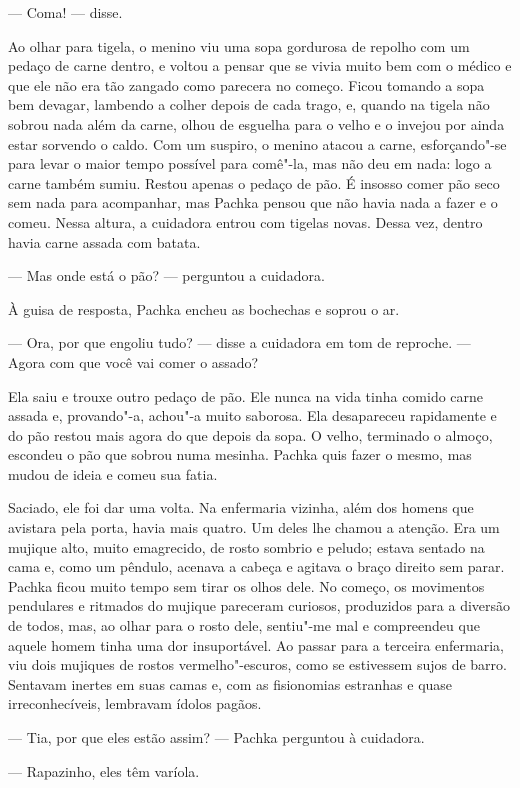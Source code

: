 --- Coma! --- disse.

Ao olhar para tigela, o menino viu uma sopa gordurosa de repolho com um
pedaço de carne dentro, e voltou a pensar que se vivia muito bem com o
médico e que ele não era tão zangado como parecera no começo. Ficou
tomando a sopa bem devagar, lambendo a colher depois de cada trago, e,
quando na tigela não sobrou nada além da carne, olhou de esguelha para o
velho e o invejou por ainda estar sorvendo o caldo. Com um suspiro, o
menino atacou a carne, esforçando"-se para levar o maior tempo possível
para comê"-la, mas não deu em nada: logo a carne também sumiu. Restou
apenas o pedaço de pão. É insosso comer pão seco sem nada para
acompanhar, mas Pachka pensou que não havia nada a fazer e o comeu.
Nessa altura, a cuidadora entrou com tigelas novas. Dessa vez, dentro
havia carne assada com batata.

--- Mas onde está o pão? --- perguntou a cuidadora.

À guisa de resposta, Pachka encheu as bochechas e soprou o ar.

--- Ora, por que engoliu tudo? --- disse a cuidadora em tom de reproche.
--- Agora com que você vai comer o assado?

Ela saiu e trouxe outro pedaço de pão. Ele nunca na vida tinha comido
carne assada e, provando"-a, achou"-a muito saborosa. Ela desapareceu
rapidamente e do pão restou mais agora do que depois da sopa. O velho,
terminado o almoço, escondeu o pão que sobrou numa mesinha. Pachka quis
fazer o mesmo, mas mudou de ideia e comeu sua fatia.

Saciado, ele foi dar uma volta. Na enfermaria vizinha, além dos homens
que avistara pela porta, havia mais quatro. Um deles lhe chamou a
atenção. Era um mujique alto, muito emagrecido, de rosto sombrio e
peludo; estava sentado na cama e, como um pêndulo, acenava a cabeça e
agitava o braço direito sem parar. Pachka ficou muito tempo sem tirar os
olhos dele. No começo, os movimentos pendulares e ritmados do mujique
pareceram curiosos, produzidos para a diversão de todos, mas, ao olhar
para o rosto dele, sentiu"-me mal e compreendeu que aquele homem
tinha uma dor insuportável. Ao passar para a terceira enfermaria, viu
dois mujiques de rostos vermelho"-escuros, como se estivessem sujos de
barro. Sentavam inertes em suas camas e, com as fisionomias estranhas e
quase irreconhecíveis, lembravam ídolos pagãos.

--- Tia, por que eles estão assim? --- Pachka perguntou à cuidadora.

--- Rapazinho, eles têm varíola.

